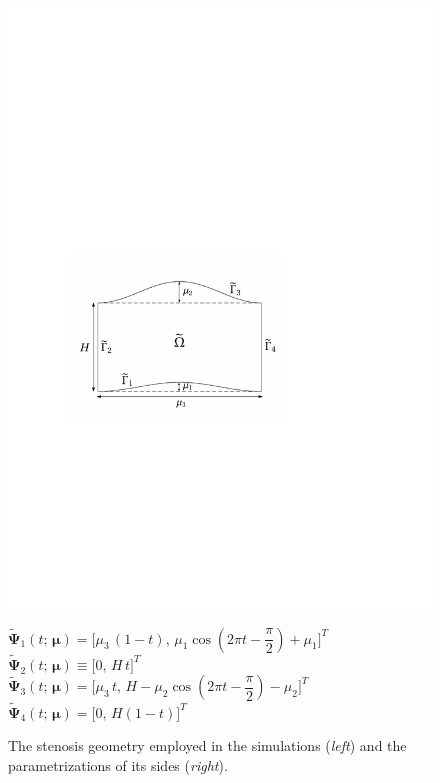 \documentclass[12pt, a4paper, twoside, openright, notitlepage]{report}
\numberwithin{equation}{chapter}
\theoremstyle{theorem}
\theoremstyle{definition}
\theoremstyle{remark}
\theoremstyle{proposition}
\numberwithin{figure}{chapter}
\newcommand{\wt}[1]{\widetilde{#1}}
\newcommand{\bg}[1]{\boldsymbol{#1}}
\begin{document}
\begin{figure}[H]
			\begin{minipage}{0.4\textwidth}
				\center
				\includegraphics[scale = 0.65, trim = {0 0 0 1cm}, clip]{domain_stenosis}
			\end{minipage}
			\hfill
			\begin{minipage}{0.5\textwidth}
				$\wt{\bg{\Psi}}_1(t; \, \bg{\mu}) = \big[ \mu_3 \, (1-t), \, \mu_1 \cos\left( 2 \pi t - \dfrac{\pi}{2} \right) + \mu_1 \big]^T$ \\[0.15cm]
				$\wt{\bg{\Psi}}_2(t; \, \bg{\mu}) \equiv \big[ 0, \, H \, t \big]^T$ \\[0.15cm]
				$\wt{\bg{\Psi}}_3(t; \, \bg{\mu}) = \big[ \mu_3 \, t, \, H - \mu_2 \cos\left( 2 \pi t - \dfrac{\pi}{2} \right) - \mu_2 \big]^T$ \\[0.15cm]
				$\wt{\bg{\Psi}}_4(t; \, \bg{\mu}) = \big[ 0, \, H (1 - t) \big]^T$
			\end{minipage}
			
			\vspace*{-0.5cm}
			
			\caption{The stenosis geometry employed in the simulations (\emph{left}) and the parametrizations of its sides (\emph{right}).}
			\label{fig:stenosis-domain}
		\end{figure}
		
\end{document}
